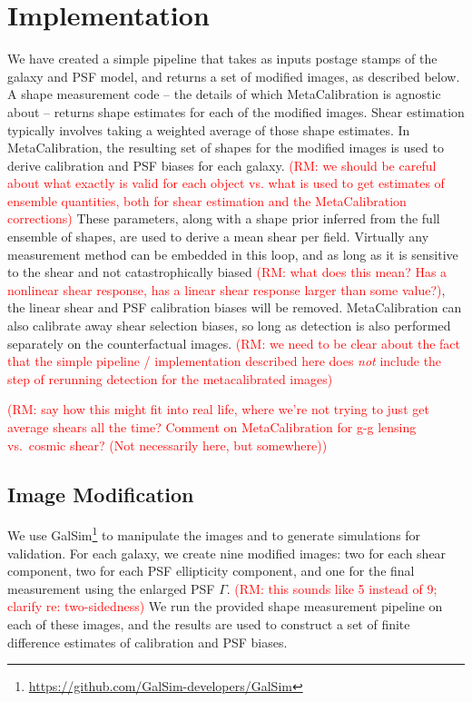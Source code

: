 \documentclass[iop]{emulateapj}
\newcommand\rmcomment[1]{\textcolor{red}{(RM: #1)}}
\begin{document}
\section{Implementation}
We have created a simple pipeline that takes as inputs postage stamps
of the galaxy and PSF model, and returns a set of modified images, as
described below. A shape measurement code -- the details of which
MetaCalibration is agnostic about -- returns shape estimates
for each of the modified images. Shear estimation typically involves taking a weighted average of
those shape estimates.  In MetaCalibration, the resulting set of shapes for the modified images is used
to derive calibration and PSF biases for each galaxy. \rmcomment{we should be careful about what
  exactly is valid for each object vs. what is used to get estimates of ensemble quantities, both
  for shear estimation and the MetaCalibration corrections}  These
parameters, along with a shape prior inferred from the full ensemble
of shapes, are used to derive a mean shear per field. Virtually any
measurement method can be embedded in this loop, and as long as it is
sensitive to the shear and not catastrophically biased \rmcomment{what does this mean?  Has a
  nonlinear shear response, has a linear shear response larger than some value?}, the linear
shear and PSF calibration biases will be removed. MetaCalibration can
also calibrate away shear selection biases, so long as detection is
also performed separately on the counterfactual images. 
\rmcomment{we need to be clear about the fact that the simple pipeline / implementation described
  here does {\em not} include the step of rerunning detection for the metacalibrated images}

\rmcomment{say how this might fit into real life, where we're not trying to just get average shears
  all the time?  Comment on MetaCalibration for g-g lensing vs.\ cosmic shear?  (Not necessarily
  here, but somewhere)}

\subsection{Image Modification}
We use
GalSim\footnote{\url{https://github.com/GalSim-developers/GalSim}}
to manipulate the images and to generate
simulations for validation. For each galaxy, we create nine modified
images: two for each shear component, two for each PSF ellipticity
component, and one for the final measurement using the enlarged PSF $\Gamma$. \rmcomment{this sounds
  like 5 instead of 9; clarify re: two-sidedness} We run the provided
shape measurement pipeline on each of these images, and the results
are used to construct a set of finite difference estimates of
calibration and PSF biases.
\end{document}
